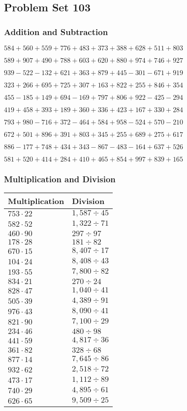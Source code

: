 \hypertarget{problem-set-103}{%
\subsection{Problem Set 103}\label{problem-set-103}}

\hypertarget{addition-and-subtraction}{%
\subsubsection{Addition and
Subtraction}\label{addition-and-subtraction}}

\(584 +560 +559 +776 +483 +373 +388 +628 +511 +803\)

\(589 +907 +490 +788 +603 +620 +880 +974 +746 +927\)

\(939 - 522 - 132 +621 +363 +879 +445 - 301 - 671 +919\)

\(323 +266 +695 +725 +307 +163 +822 +255 +846 +354\)

\(455 - 185 +149 +694 - 169 +797 +806 +922 - 425 - 294\)

\(419 +458 +393 +189 +360 +336 +423 +167 +330 +284\)

\(793 +980 - 716 +372 - 464 +584 +958 - 524 +570 - 210\)

\(672 +501 +896 +391 +803 +345 +255 +689 +275 +617\)

\(886 - 177 +748 +434 +343 - 867 - 483 - 164 +637 +526\)

\(581 +520 +414 +284 +410 +465 +854 +997 +839 +165\)

\hypertarget{multiplication-and-division}{%
\subsubsection{Multiplication and
Division}\label{multiplication-and-division}}

\begin{longtable}[]{@{}ll@{}}
\toprule
Multiplication & Division\tabularnewline
\midrule
\endhead
\(753 \cdot 22\) & \(1,587÷45\)\tabularnewline
\(582 \cdot 52\) & \(1,322÷71\)\tabularnewline
\(460 \cdot 90\) & \(297÷97\)\tabularnewline
\(178 \cdot 28\) & \(181÷82\)\tabularnewline
\(670 \cdot 15\) & \(8,407÷17\)\tabularnewline
\(104 \cdot 24\) & \(8,408÷43\)\tabularnewline
\(193 \cdot 55\) & \(7,800÷82\)\tabularnewline
\(834 \cdot 21\) & \(270÷24\)\tabularnewline
\(828 \cdot 47\) & \(1,040÷41\)\tabularnewline
\(505 \cdot 39\) & \(4,389÷91\)\tabularnewline
\(976 \cdot 43\) & \(8,090÷41\)\tabularnewline
\(821 \cdot 90\) & \(7,100÷29\)\tabularnewline
\(234 \cdot 46\) & \(480÷98\)\tabularnewline
\(441 \cdot 59\) & \(4,817÷36\)\tabularnewline
\(361 \cdot 82\) & \(328÷68\)\tabularnewline
\(877 \cdot 14\) & \(7,645÷86\)\tabularnewline
\(932 \cdot 62\) & \(2,518÷72\)\tabularnewline
\(473 \cdot 17\) & \(1,112÷89\)\tabularnewline
\(740 \cdot 29\) & \(4,895÷61\)\tabularnewline
\(626 \cdot 65\) & \(9,509÷25\)\tabularnewline
\bottomrule
\end{longtable}
